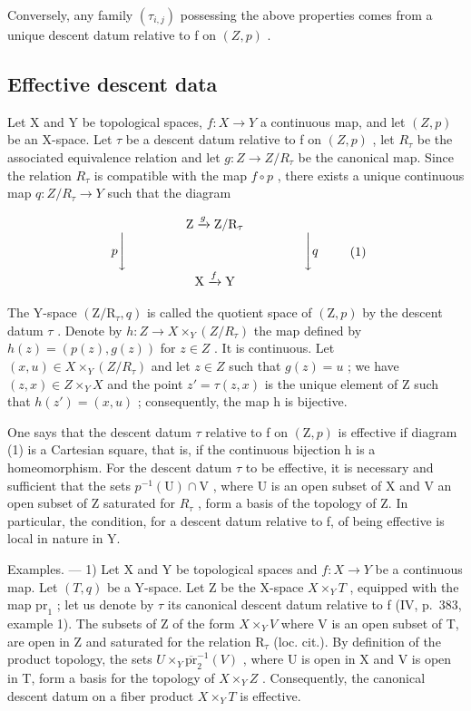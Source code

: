 Conversely, any family \((\tau_{i,j})\) possessing the above properties comes from a unique descent datum relative to f on \((Z,p)\) .

\subsection{Effective descent data}

Let X and Y be topological spaces, \(f: X \to Y\) a continuous map, and let \((Z, p)\) be an X-space. Let \(\tau\) be a descent datum relative to f on \((Z, p)\) , let \(R_{\tau}\) be the associated equivalence relation and let \(g: Z \to Z/R_{\tau}\) be the canonical map. Since the relation \(R_{\tau}\) is compatible with the map \(f \circ p\) , there exists a unique continuous map \(q: Z/R_{\tau} \to Y\) such that the diagram

\[
\begin{array}{c} \mathrm{Z} \xrightarrow {g} \mathrm{Z} / \mathrm{R} _ {\tau} \\ p \Biggl \downarrow \qquad \qquad \qquad \qquad \qquad \qquad \qquad \Biggl \downarrow q \\ \mathrm{X} \xrightarrow {f} \mathrm{Y} \end{array}\tag{1}
\]

The Y-space \((\mathrm{Z}/\mathrm{R}_{\tau}, q)\) is called the quotient space of \((\mathrm{Z}, p)\) by the descent datum \(\tau\) . Denote by \(h: Z \to X \times_{Y} (Z/R_{\tau})\) the map defined by \(h(z) = (p(z), g(z))\) for \(z \in Z\) . It is continuous. Let \((x, u) \in X \times_{Y} (Z/R_{\tau})\) and let \(z \in Z\) such that \(g(z) = u\) ; we have \((z, x) \in Z \times_{Y} X\) and the point \(z' = \tau(z, x)\) is the unique element of Z such that \(h(z') = (x, u)\) ; consequently, the map h is bijective.

One says that the descent datum \(\tau\) relative to f on \((\mathrm{Z},p)\) is effective if diagram (1) is a Cartesian square, that is, if the continuous bijection h is a homeomorphism. For the descent datum \(\tau\) to be effective, it is necessary and sufficient that the sets \(p^{-1}(\mathrm{U})\cap \mathrm{V}\) , where U is an open subset of X and V an open subset of Z saturated for \(R_{\tau}\) , form a basis of the topology of Z. In particular, the condition, for a descent datum relative to f, of being effective is local in nature in Y.

Examples. --- 1) Let X and Y be topological spaces and \(f\colon X\to Y\) be a continuous map. Let \((T,q)\) be a Y-space. Let Z be the X-space \(X\times_Y T\) , equipped with the map \(\mathrm{pr}_{1}\) ; let us denote by \(\tau\) its canonical descent datum relative to f (IV, p.~383, example 1). The subsets of Z of the form \(X\times_Y V\) where V is an open subset of T, are open in Z and saturated for the relation \(\mathrm{R}_{\tau}\) (loc. cit.). By definition of the product topology, the sets \(U\times_Y\overline{\mathrm{pr}}_{2}^{-1}(V)\) , where U is open in X and V is open in T, form a basis for the topology of \(X\times_Y Z\) . Consequently, the canonical descent datum on a fiber product \(X\times_Y T\) is effective.

